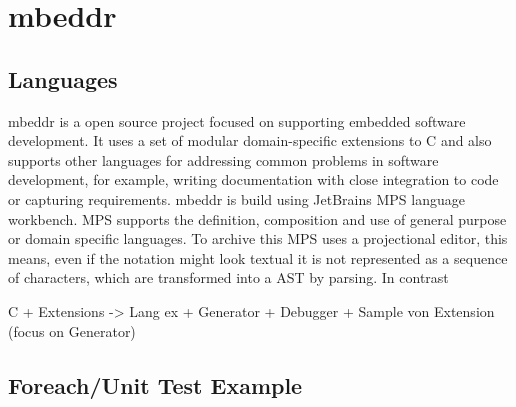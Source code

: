 \section{mbeddr}

\subsection{Languages}
mbeddr is a open source project focused on supporting embedded software development. It uses a set of modular domain-specific extensions to C and also supports other languages for addressing common problems in software development, for example, writing documentation with close integration to code or capturing requirements. mbeddr is build using JetBrains MPS language workbench. MPS supports the definition, composition and use of general purpose or domain specific languages. To archive this MPS uses a projectional editor, this means, even if the notation might look textual it is not represented as a sequence of characters, which are transformed into a AST by parsing. In contrast 

C + Extensions 
	    -> Lang ex +  Generator + Debugger
		+ Sample von Extension (focus on Generator)
		
\subsection{Foreach/Unit Test Example}

